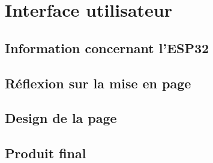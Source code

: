 \chapter{Interface utilisateur}

\section{Information concernant l'ESP32}

\section{Réflexion sur la mise en page}

\section{Design de la page}

\section{Produit final}
